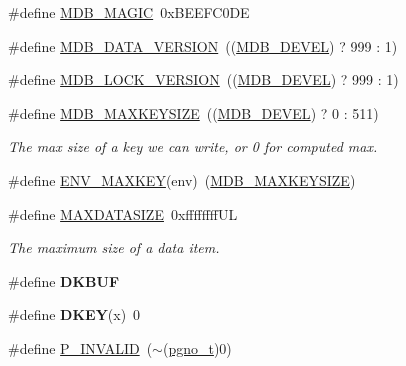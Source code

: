 \begin{DoxyCompactItemize}
\#define \mbox{\hyperlink{group__internal_ga4cac6326c08147a019e8ddb17ad712f6}{M\+D\+B\+\_\+\+M\+A\+G\+IC}}~0x\+B\+E\+E\+F\+C0\+DE
\item 
\#define \mbox{\hyperlink{group__internal_ga5d462b5ef39d34a85e633eb238655ce2}{M\+D\+B\+\_\+\+D\+A\+T\+A\+\_\+\+V\+E\+R\+S\+I\+ON}}~((\mbox{\hyperlink{group__compat_ga103b045068a1d21bf2347a7342f8f486}{M\+D\+B\+\_\+\+D\+E\+V\+EL}}) ? 999 \+: 1)
\item 
\#define \mbox{\hyperlink{group__internal_ga1d56e55199f31cd585300a2b73c22d82}{M\+D\+B\+\_\+\+L\+O\+C\+K\+\_\+\+V\+E\+R\+S\+I\+ON}}~((\mbox{\hyperlink{group__compat_ga103b045068a1d21bf2347a7342f8f486}{M\+D\+B\+\_\+\+D\+E\+V\+EL}}) ? 999 \+: 1)
\item 
\#define \mbox{\hyperlink{group__internal_gac929399f5d93cef85f874b9e9b1d09e0}{M\+D\+B\+\_\+\+M\+A\+X\+K\+E\+Y\+S\+I\+ZE}}~((\mbox{\hyperlink{group__compat_ga103b045068a1d21bf2347a7342f8f486}{M\+D\+B\+\_\+\+D\+E\+V\+EL}}) ? 0 \+: 511)
\begin{DoxyCompactList}\small\item\em The max size of a key we can write, or 0 for computed max. \end{DoxyCompactList}\item 
\#define \mbox{\hyperlink{group__internal_ga81fe7e8b859d93e245ac73990bbeb90b}{E\+N\+V\+\_\+\+M\+A\+X\+K\+EY}}(env)~(\mbox{\hyperlink{group__internal_gac929399f5d93cef85f874b9e9b1d09e0}{M\+D\+B\+\_\+\+M\+A\+X\+K\+E\+Y\+S\+I\+ZE}})
\item 
\#define \mbox{\hyperlink{group__internal_ga16c16f9369be4a374a3e621f6d13bb16}{M\+A\+X\+D\+A\+T\+A\+S\+I\+ZE}}~0xffffffff\+UL
\begin{DoxyCompactList}\small\item\em The maximum size of a data item. \end{DoxyCompactList}\item 
\mbox{\label{group__internal_gafb2bd421e699f53a889ca61fdc9a1c0e}} 
\#define {\bfseries D\+K\+B\+UF}
\item 
\mbox{\label{group__internal_ga892e3ab33e6c71a04de01439dadb627b}} 
\#define {\bfseries D\+K\+EY}(x)~0
\item 
\#define \mbox{\hyperlink{group__internal_gab8a290bcd98f0e825c9c950a6c25d01b}{P\+\_\+\+I\+N\+V\+A\+L\+ID}}~($\sim$(\mbox{\hyperlink{group__internal_gadb65f0424c9d3827bf6409087ad555cd}{pgno\+\_\+t}})0)
\item 

\end{DoxyCompactItemize}

